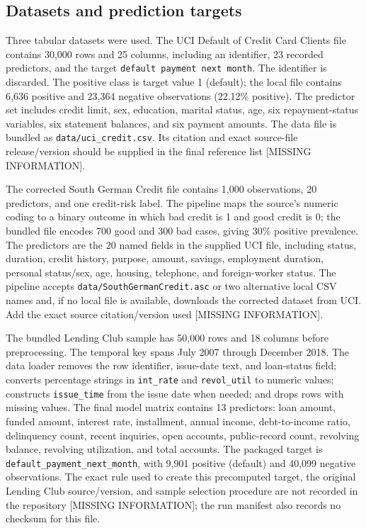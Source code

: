 \documentclass[pdflatex,sn-mathphys-num]{sn-jnl}
\begin{document}
\subsection{Datasets and prediction targets}
Three tabular datasets were used. The UCI Default of Credit Card Clients file contains 30,000 rows and 25 columns, including an identifier, 23 recorded predictors, and the target \texttt{default payment next month}. The identifier is discarded. The positive class is target value 1 (default); the local file contains 6,636 positive and 23,364 negative observations (22.12\% positive). The predictor set includes credit limit, sex, education, marital status, age, six repayment-status variables, six statement balances, and six payment amounts. The data file is bundled as \texttt{data/uci\_credit.csv}. Its citation and exact source-file release/version should be supplied in the final reference list [MISSING INFORMATION].

The corrected South German Credit file contains 1,000 observations, 20 predictors, and one credit-risk label. The pipeline maps the source's numeric coding to a binary outcome in which bad credit is 1 and good credit is 0; the bundled file encodes 700 good and 300 bad cases, giving 30\% positive prevalence. The predictors are the 20 named fields in the supplied UCI file, including status, duration, credit history, purpose, amount, savings, employment duration, personal status/sex, age, housing, telephone, and foreign-worker status. The pipeline accepts \texttt{data/SouthGermanCredit.asc} or two alternative local CSV names and, if no local file is available, downloads the corrected dataset from UCI. Add the exact source citation/version used [MISSING INFORMATION].

The bundled Lending Club sample has 50,000 rows and 18 columns before preprocessing. The temporal key spans July 2007 through December 2018. The data loader removes the row identifier, issue-date text, and loan-status field; converts percentage strings in \texttt{int\_rate} and \texttt{revol\_util} to numeric values; constructs \texttt{issue\_time} from the issue date when needed; and drops rows with missing values. The final model matrix contains 13 predictors: loan amount, funded amount, interest rate, installment, annual income, debt-to-income ratio, delinquency count, recent inquiries, open accounts, public-record count, revolving balance, revolving utilization, and total accounts. The packaged target is \texttt{default\_payment\_next\_month}, with 9,901 positive (default) and 40,099 negative observations. The exact rule used to create this precomputed target, the original Lending Club source/version, and sample selection procedure are not recorded in the repository [MISSING INFORMATION]; the run manifest also records no checksum for this file.
\end{document}
